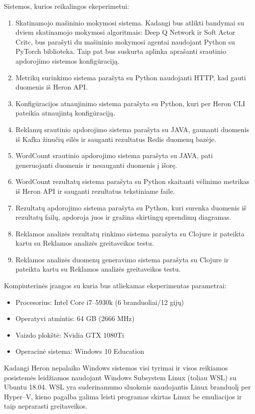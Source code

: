 \documentclass{VUMIFPSbakalaurinis}
\begin{document}
Sistemos, kurios reikalingos ekeperimetui:
\begin{enumerate}
    \item Skatinamojo mašininio mokymosi sistema. Kadangi bus atlikti bandymai su dviem skatinamojo mokymosi algoritmais: Deep Q Network ir Soft Actor Critc, bus parašyti du mašininio mokymosi agentai naudojant Python su PyTorch biblioteka. Taip pat bus suskurta aplinka aprašanti srautinio apdorojimo sistemos konfigūraciją. 
    \item Metrikų surinkimo sistema parašyta su Python naudojanti HTTP, kad gauti duomenis iš Heron API.
    \item Konfigūracijos atnaujinimo sistema parašyta su Python, kuri per Heron CLI pateikia atnaujintą konfigūraciją.
    \item Reklamų srautinio apdorojimo sistema parašyta su JAVA, gaunanti duomenis iš Kafka žinučių eilės ir sauganti rezultatus Redis duomenų bazėje.
    \item WordCount srautinio apdorojimo sistema parašyta su JAVA, pati generuojanti duomenis ir nesauganti duomenis į išorę. 
    \item WordCount rezultatų sistema parašyta su Python skaitanti vėlinimo metrikas iš Heron API ir sauganti rezultatus tekstiniame faile.
    \item Rezultatų apdorojimo sistema parašyta su Python, kuri surenka duomenis iš rezultatų failų, apdoroja  juos ir gražina skirtingų sprendimų diagramas.
    \item Reklamos analizės rezultatų rinkimo sistema parašyta su Clojure ir pateikta kartu su Reklamos analizės greitaveikos testu.
    \item Reklamos analizės duomenų generavimo sistema parašyta su Clojure ir pateikta kartu su Reklamos analizės greitaveikos testu.
\end{enumerate}

Kompiuterinės įrangos su kuria bus atliekamas eksperimentas parametrai:
\begin{itemize}
    \item Procesorius: Intel Core i7–5930k (6 branduoliai/12 gijų)
    \item Operatyvi atmintis: 64 GB (2666 MHz)
    \item Vaizdo plokštė: Nvidia GTX 1080Ti
    \item Operacinė sistema: Windows 10 Education
\end{itemize}

Kadangi Heron nepalaiko Windows sistemos visi tyrimai ir visos reikiamos posistemės leidžiamos naudojant Windows Subsystem Linux (toliau WSL) su Ubuntu 18.04. WSL yra suderinamumo sluoksnis naudojantis Linux branduolį per Hyper–V, kieno pagalba galima leisti programas skirtas Linux be emuliacijos ir taip neprarasti greitaveikos.
\end{document}

